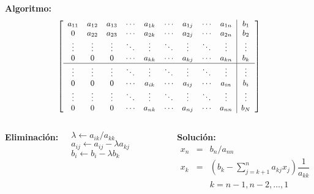 \documentclass[9pt, aspectratio=169]{beamer}
\begin{document}
\begin{frame}
\textbf{Algoritmo:}
\begin{equation*} {\small
\left[ 
 \begin{array}{ccccccccc|c}
 a_{11} & a_{12} & a_{13} & \cdots & a_{1k} & \cdots & a_{1j} & \cdots & a_{1n} & b_1 \\
 0      & a_{22} & a_{23} & \cdots & a_{2k} & \cdots & a_{2j} & \cdots & a_{2n} & b_2 \\
 \vdots & \vdots & \vdots & \ddots & \vdots & \ddots & \vdots & \ddots & \vdots & \vdots \\
 0      & 0      & 0      & \cdots & a_{kk} & \cdots & a_{kj} & \cdots & a_{kn} & b_k \\
 \hline
\vdots & \vdots & \vdots & \ddots & \vdots & \ddots & \vdots & \ddots & \vdots & \vdots \\
 0      & 0      & 0      & \cdots & a_{ik} & \cdots & a_{ij} & \cdots & a_{in} & b_i \\
\vdots & \vdots & \vdots & \ddots & \vdots & \ddots & \vdots & \ddots & \vdots & \vdots \\
 0      & 0      & 0      & \cdots & a_{nk} & \cdots & a_{nj} & \cdots & a_{nn} & b_N \\
 \end{array} \right] }
\end{equation*}
\begin{columns}[t]
\column{5cm}
\textbf{Eliminación:} {\small
\begin{algorithmic}[1]
    \State $\lambda \gets a_{ik}/a_{kk}$
      \State $a_{ij} \gets a_{ij} - \lambda a_{kj}$
    \EndFor
    \State $b_i \gets b_i - \lambda b_k$
 \EndFor	
\end{algorithmic} }
\column{6cm}
\textbf{Solución:} {\small
\begin{eqnarray*}
 x_n &=& b_n / a_{nn} \\
 x_k &=& \left( b_k- \sum_{j=k+1}^n a_{kj}x_j \right)  \dfrac{1}{a_{kk}} \\
 & &k = n-1, n-2, \ldots, 1
\end{eqnarray*} }
\end{columns}
\end{frame}
\end{document}
